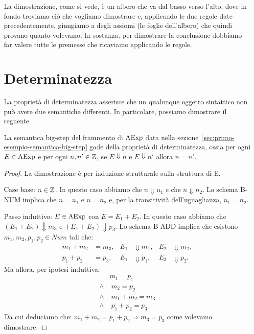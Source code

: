 La dimostrazione, come si vede, è un albero che va dal basso verso l'alto, dove
in fondo troviamo ciò che vogliamo dimostrare e, applicando le due regole date precedentemente,
giungiamo a degli assiomi (le foglie dell'albero) che quindi provano quanto volevamo.
In sostanza, per dimostrare la conclusione dobbiamo far valere tutte le premesse che ricaviamo
applicando le regole.

\section{Determinatezza}

La proprietà di determinatezza asserisce che un qualunque oggetto
sintattico non può avere due semantiche differenti. In particolare,
possiamo dimostrare il seguente

\begin{teorema} 
La semantica big-step del frammento di $\mathrm{AExp}$ data nella
sezione~\textup{\ref{sec:primo-esempio-semantica-big-step}}
gode della proprietà di determinatezza, ossia
per ogni $E \in \mathrm{AExp}$ e per ogni $n, n' \in \mathbb{Z}$,
se $E \Downarrow n$ e $E \Downarrow n'$ allora $n = n'$.
\end{teorema}

\begin{proof}
La dimostrazione è per induzione strutturale sulla struttura di E.

Case base: $n \in \mathbb{Z}$.
In questo caso abbiamo che $n \Downarrow n_1$ e che $n \Downarrow n_2$.
Lo schema B-NUM implica che $n = n_1$ e $n = n_2$ e,
per la transitività dell'uguaglianza, $n_1 = n_2$.

Passo induttivo: $E \in \mathrm{AExp}$ con $E = E_1 + E_2$.
In questo caso abbiamo che $(E_1 + E_2) \Downarrow m_3$
e $(E_1 + E_2) \Downarrow p_3$.
Lo schema B-ADD implica che esistono
$m_1, m_2, p_1, p_2 \in Num$ tali che:
\begin{align*}
  m_1 + m_2 &= m_3, & E_1 &\Downarrow m_1, & E_2 &\Downarrow m_2, \\
  p_1 + p_2 &= p_3, & E_1 &\Downarrow p_1, & E_2 &\Downarrow p_2.
\end{align*}
		  Ma allora, per ipotesi induttiva:
		  \begin{align*}
		  & m_1 = p_1 \\
		    \land & \; m_2 = p_2 \\
		    \land & \; m_1+m_2=m_3 \\
		    \land & \; p_1 + p_2 = p_3
		  \end{align*}
		  Da cui deduciamo che:
		  $ m_1 + m_2 = p_1 + p_2 \Rightarrow m_3 = p_3$ come volevamo dimostrare.
\end{proof}

